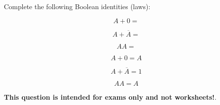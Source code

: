 

Complete the following Boolean identities (laws):

$$A + 0 = $$

$$A + \overline{A} = $$

$$A A = $$







$$A + 0 = A$$

$$A + \overline{A} = 1$$

$$A A = A$$







{\bf This question is intended for exams only and not worksheets!}.




